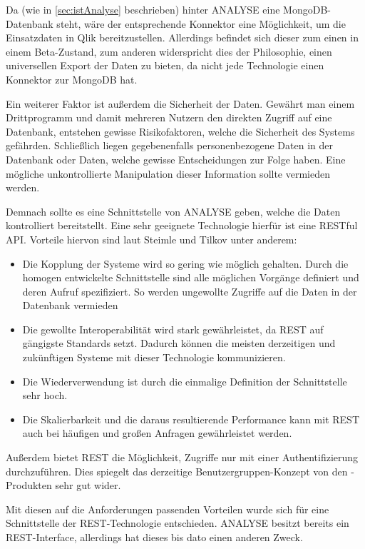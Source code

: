 Da (wie in \ref{sec:istAnalyse} beschrieben) hinter \gls{ANALYSE} eine MongoDB-Datenbank steht, wäre der entsprechende Konnektor eine Möglichkeit, um die Einsatzdaten in Qlik bereitzustellen.
Allerdings befindet sich dieser zum einen in einem Beta-Zustand, zum anderen widerspricht dies der Philosophie, einen universellen Export der Daten zu bieten, da nicht jede Technologie einen Konnektor zur MongoDB hat. 

Ein weiterer Faktor ist außerdem die Sicherheit der Daten.
Gewährt man einem Drittprogramm und damit mehreren Nutzern den direkten Zugriff auf eine Datenbank, entstehen gewisse Risikofaktoren, welche die Sicherheit des Systems gefährden.
Schließlich liegen gegebenenfalls personenbezogene Daten in der Datenbank oder Daten, welche gewisse Entscheidungen zur Folge haben.
Eine mögliche unkontrollierte Manipulation dieser Information sollte vermieden werden.

Demnach sollte es eine Schnittstelle von \gls{ANALYSE} geben, welche die Daten kontrolliert bereitstellt.
Eine sehr geeignete Technologie hierfür ist eine \gls{REST}ful API.
Vorteile hiervon sind laut Steimle \cite[2.3]{Steimle.2014} und Tilkov \cite[1.1]{Tilkov.2011} unter anderem:
\begin{itemize}
\item Die Kopplung der Systeme wird so gering wie möglich gehalten. 
Durch die homogen entwickelte Schnittstelle sind alle möglichen Vorgänge definiert und deren Aufruf spezifiziert.
So werden ungewollte Zugriffe auf die Daten in der Datenbank vermieden
\item Die gewollte Interoperabilität wird stark gewährleistet, da \gls{REST} auf gängigste Standards setzt. 
Dadurch können die meisten derzeitigen und zukünftigen Systeme mit dieser Technologie kommunizieren.
\item Die Wiederverwendung ist durch die einmalige Definition der Schnittstelle sehr hoch.
\item Die Skalierbarkeit und die daraus resultierende Performance kann mit \gls{REST} auch bei häufigen und großen Anfragen gewährleistet werden.
\end{itemize}

Außerdem bietet \gls{REST} die Möglichkeit, Zugriffe nur mit einer Authentifizierung durchzuführen.
Dies spiegelt das derzeitige Benutzergruppen-Konzept von den \cweb-Produkten sehr gut wider.

Mit diesen auf die Anforderungen passenden Vorteilen wurde sich für eine Schnittstelle der \gls{REST}-Technologie entschieden.
\gls{ANALYSE} besitzt bereits ein \gls{REST}-Interface, allerdings hat dieses bis dato einen anderen Zweck.

